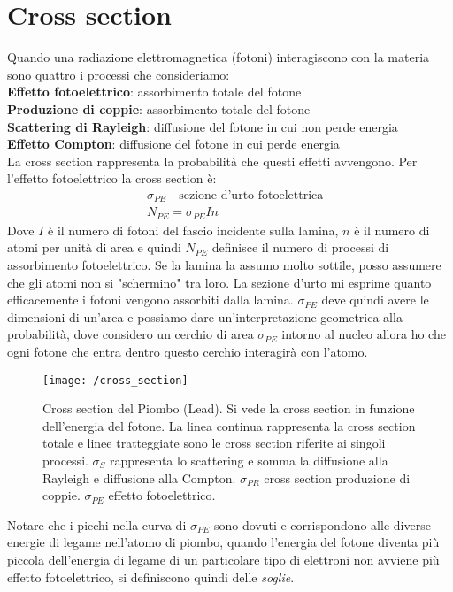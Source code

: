 \section{Cross section}

Quando una radiazione elettromagnetica (fotoni) interagiscono con la materia sono quattro i processi che consideriamo: \\
\textbf{Effetto fotoelettrico}: assorbimento totale del fotone \\
\textbf{Produzione di coppie}: assorbimento totale del fotone \\
\textbf{Scattering di Rayleigh}: diffusione del fotone in cui non perde energia \\
\textbf{Effetto Compton}: diffusione del fotone in cui perde energia \\

La cross section rappresenta la probabilità che questi effetti avvengono.
Per l'effetto fotoelettrico la cross section è:
\begin{equation}
\begin{split}
& \sigma_{PE} \quad \mbox{sezione d'urto fotoelettrica} \\
& N_{PE} = \sigma_{PE} I n
\end{split}
\end{equation}
Dove $I$ è il numero di fotoni del fascio incidente sulla lamina, $n$ è il numero di atomi per unità di area e quindi $N_{PE}$ definisce il numero di processi di assorbimento fotoelettrico.
Se la lamina la assumo molto sottile, posso assumere che gli atomi non si "schermino" tra loro.
La sezione d'urto mi esprime quanto efficacemente i fotoni vengono assorbiti dalla lamina.
$\sigma_{PE}$ deve quindi avere le dimensioni di un'area e possiamo dare un'interpretazione geometrica alla probabilità, dove considero un cerchio di area $\sigma_{PE}$ intorno al nucleo allora ho che ogni fotone che entra dentro questo cerchio interagirà con l'atomo.

\begin{figure}[h]
\centering
\texttt{[image: /cross\_section]}
\caption{Cross section del Piombo (Lead). Si vede la cross section in funzione dell'energia del fotone. La linea continua rappresenta la cross section totale e linee tratteggiate sono le cross section riferite ai singoli processi. $\sigma_S$ rappresenta lo scattering e somma la diffusione alla Rayleigh e diffusione alla Compton. $\sigma_{PR}$ cross section produzione di coppie. $\sigma_{PE}$ effetto fotoelettrico.}
\end{figure}

Notare che i picchi nella curva di $\sigma_{PE}$ sono dovuti e corrispondono alle diverse energie di legame nell'atomo di piombo, quando l'energia del fotone diventa più piccola dell'energia di legame di un particolare tipo di elettroni non avviene più effetto fotoelettrico, si definiscono quindi delle \textit{soglie}.
